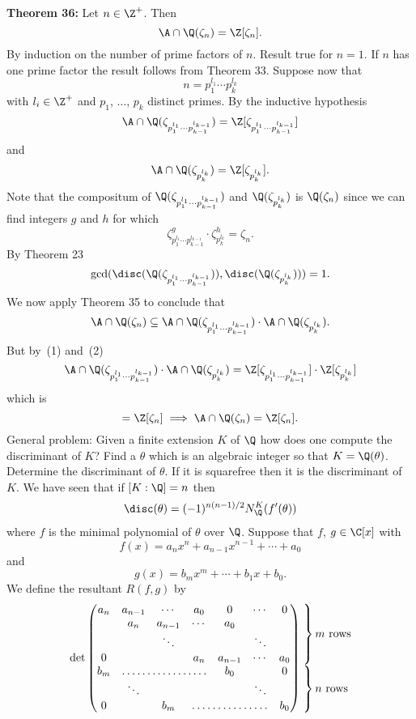 \textbf{Theorem 36:} Let $n\in\Z^+$.  Then
\[ \A \cap \Q(\zeta_n) = \Z[\zeta_n] . \]
\pf By induction on the number of prime factors of $n$.  Result true for $n=1$.  If $n$ has one prime factor the result follows from Theorem 33.  Suppose now that
\[ n = p_1^{l_1}\dotsm p_k^{l_k} \]
with $l_i\in\Z^+$ and $p_1$, $\dotsc$, $p_k$ distinct primes.  By the inductive hypothesis
\[ \A \cap \Q(\zeta_{p_1^{l_1}\dotsm p_{k-1}^{l_{k-1}}}) = \Z[\zeta_{p_1^{l_1}\dotsm p_{k-1}^{l_{k-1}}}] \]
and
\[ \A \cap \Q(\zeta_{p_k^{l_k}}) = \Z[\zeta_{p_k^{l_k}}] . \]
Note that the compositum of $\Q(\zeta_{p_1^{l_1}\dotsm p_{k-1}^{l_{k-1}}})$ and $\Q(\zeta_{p_k^{l_k}})$ is $\Q(\zeta_n)$ since we can find integers $g$ and $h$ for which
\[ \zeta_{p_1^{l_1}\dotsm p_{k-1}^{l_{k-1}}}^g\cdot\zeta_{p_k^{l_k}}^h = \zeta_n . \]
By Theorem 23
\[ \gcd(\disc(\Q(\zeta_{p_1^{l_1}\dotsm p_{k-1}^{l_{k-1}}})),\disc(\Q(\zeta_{p_k^{l_k}}))) = 1 . \]
We now apply Theorem 35 to conclude that
\[ \A \cap \Q(\zeta_n) \subseteq \A \cap \Q(\zeta_{p_1^{l_1}\dotsm p_{k-1}^{l_{k-1}}})\cdot\A\cap\Q(\zeta_{p_k^{l_k}}) . \]
But by~(1) and~(2)
\[ \A\cap\Q(\zeta_{p_1^{l_1}\dotsm p_{k-1}^{l_{k-1}}})\cdot\A\cap\Q(\zeta_{p_k^{l_k}}) = \Z[\zeta_{p_1^{l_1}\dotsm p_{k-1}^{l_{k-1}}}]\cdot\Z[\zeta_{p_k^{l_k}}] \]
which is
\[ = \Z[\zeta_n] \implies \A \cap \Q(\zeta_n) = \Z[\zeta_n] . \]
General problem: Given a finite extension $K$ of $\Q$ how does one compute the discriminant of $K$?  Find a $\theta$ which is an algebraic integer so that $K=\Q(\theta)$.  Determine the discriminant of $\theta$.  If it is squarefree then it is the discriminant of $K$.  We have seen that if $[K:\Q]=n$ then
\[ \disc(\theta) = (-1)^{n(n-1)/2}N_\Q^K(f'(\theta)) \]
where $f$ is the minimal polynomial of $\theta$ over $\Q$.  Suppose that $f$, $g\in\C[x]$ with
\[ f(x) = a_n x^n + a_{n-1} x^{n-1} + \dotsb + a_0 \]
and
\[ g(x) = b_m x^m + \dotsb + b_1 x + b_0 . \]
We define the resultant $R(f,g)$ by
\[ \det\begin{pmatrix}
a_n & a_{n-1} & \cdots & a_0 & 0 & \cdots & 0 \\
& a_n & a_{n-1} & \cdots & a_0 \\
& & \ddots & & & \ddots \\
0 & & & a_n & a_{n-1} & \cdots & a_0 \\
b_m & \hdotsfor{3} & b_0 & & 0 \\
& \ddots & & & & \ddots \\
0 & & b_m & \hdotsfor{3} & b_0
\end{pmatrix}\begin{array}{@{}l@{}}\left.\vphantom{\begin{matrix}0\\
\cdots\\
\ddots\\
0\\
\end{matrix}}\right\}\text{$m$ rows}\\
\left.\vphantom{\begin{matrix}0\\
\ddots\\
0\\\end{matrix}}\right\}\text{$n$ rows}
\end{array} \]
